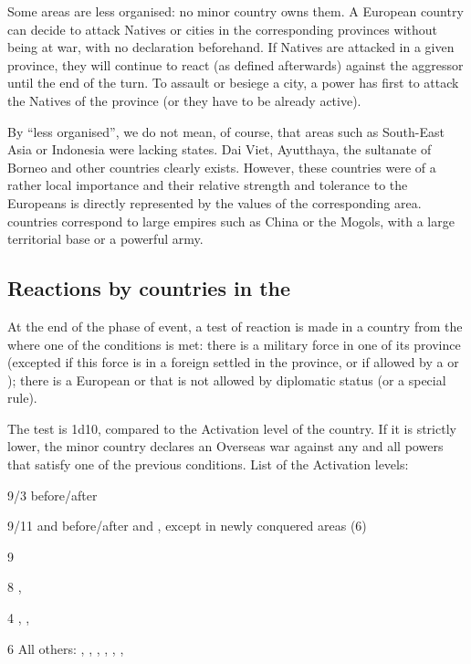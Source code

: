 Some areas are less organised: no minor country owns them. A European
country can decide to attack Natives or cities in the corresponding
provinces without being at war, with no declaration beforehand.
\bparag If Natives are attacked in a given province, they will continue
to react (as defined afterwards) against the aggressor until the end of
the turn.
\bparag To assault or besiege a city, a power has first to attack the
Natives of the province (or they have to be already active).
\begin{designnote}
  By ``less organised'', we do not mean, of course, that areas such as
  South-East Asia or Indonesia were lacking states. Dai Viet,
  Ayutthaya, the sultanate of Borneo and other countries clearly
  exists. However, these countries were of a rather local importance and
  their relative strength and tolerance to the Europeans is directly
  represented by the values of the corresponding area. \ROTW countries
  correspond to large empires such as China or the Mogols, with a large
  territorial base or a powerful army.
\end{designnote}

\subsection{Reactions by countries in the \ROTW}
\aparag At the end of the phase of event, a test of reaction is made in
a country from the \ROTW where one of the conditions is met:
\bparag there is a military force in one of its province (excepted if
this force is in a foreign \COL settled in the province, or if allowed
by a \dipFR or \dipAT);
\bparag there is a European \COL or \TP that is not allowed by
diplomatic status (or a special rule).

\aparag The test is 1d10, compared to the Activation level of the
country. If it is strictly lower, the minor country declares an Overseas
war against any and all powers that satisfy one of the previous
conditions.
\bparag List of the Activation levels:
\begin{modlist}
\item[9/3]  before/after 
\item[9/11]  and  before/after
   and
  , except in newly conquered areas
  (6)
\item[9] 
\item[8] , 
\item[4] , , 
\item[6] All others: , , ,
  , , , 
\end{modlist}

